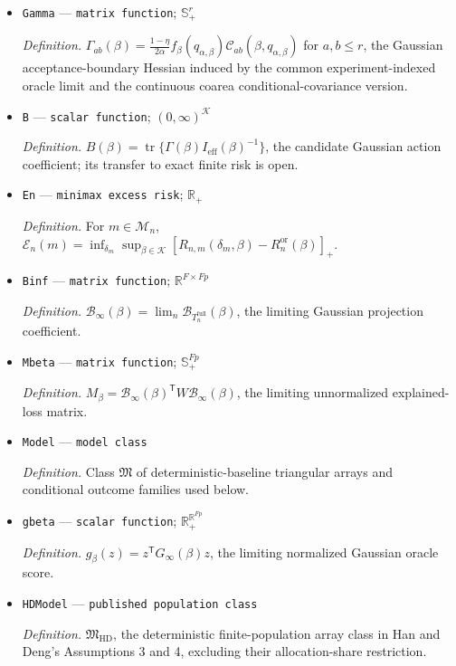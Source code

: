 \documentclass{article}
\begin{document}
\begin{itemize}
  \item \texttt{Gamma} --- \texttt{matrix function}; \(\mathbb S_{+}^{r}\)
  \par\smallskip\noindent\emph{Definition.} \(\Gamma_{ab}(\beta)=\frac{1-\eta}{2\alpha}f_{\beta}(q_{\alpha,\beta})\mathcal C_{ab}(\beta,q_{\alpha,\beta})\) for \(a,b\le r\), the Gaussian acceptance-boundary Hessian induced by the common experiment-indexed oracle limit and the continuous coarea conditional-covariance version.
  \item \texttt{B} --- \texttt{scalar function}; \((0,\infty)^{\mathcal K}\)
  \par\smallskip\noindent\emph{Definition.} \(B(\beta)=\operatorname{tr}\{\Gamma(\beta)I_{\mathrm{eff}}(\beta)^{-1}\}\), the candidate Gaussian action coefficient; its transfer to exact finite risk is open.
  \item \texttt{En} --- \texttt{minimax excess risk}; \(\mathbb R_{+}\)
  \par\smallskip\noindent\emph{Definition.} For \(m\in\mathcal M_n\), \(\mathcal E_n(m)=\inf_{\delta_m}\sup_{\beta\in\mathcal K}[R_{n,m}(\delta_m,\beta)-R_n^{\mathrm{or}}(\beta)]_{+}\).
  \item \texttt{Binf} --- \texttt{matrix function}; \(\mathbb R^{F\times Fp}\)
  \par\smallskip\noindent\emph{Definition.} \(\mathcal B_\infty(\beta)=\lim_n\mathcal B_{T_n^{\mathrm{full}}}(\beta)\), the limiting Gaussian projection coefficient.
  \item \texttt{Mbeta} --- \texttt{matrix function}; \(\mathbb S_+^{Fp}\)
  \par\smallskip\noindent\emph{Definition.} \(M_\beta=\mathcal B_\infty(\beta)^{\mathsf T}W\mathcal B_\infty(\beta)\), the limiting unnormalized explained-loss matrix.
  \item \texttt{Model} --- \texttt{model class}
  \par\smallskip\noindent\emph{Definition.} Class \(\mathfrak M\) of deterministic-baseline triangular arrays and conditional outcome families used below.
  \item \texttt{gbeta} --- \texttt{scalar function}; \(\mathbb R_+^{\mathbb R^{Fp}}\)
  \par\smallskip\noindent\emph{Definition.} \(g_\beta(z)=z^{\mathsf T}G_\infty(\beta)z\), the limiting normalized Gaussian oracle score.
  \item \texttt{HDModel} --- \texttt{published population class}
  \par\smallskip\noindent\emph{Definition.} \(\mathfrak M_{\mathrm{HD}}\), the deterministic finite-population array class in Han and Deng's Assumptions 3 and 4, excluding their allocation-share restriction.

\end{itemize}
\end{document}

